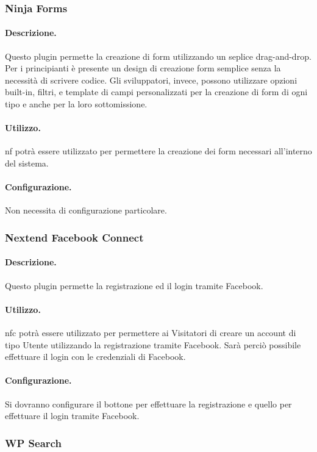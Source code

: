 \subsubsection{Ninja Forms}
\paragraph{Descrizione.} Questo plugin permette la creazione di form utilizzando un seplice drag-and-drop. Per i principianti è presente un design di creazione form semplice senza la necessità di scrivere codice. Gli sviluppatori, invece, possono utilizzare opzioni built-in, filtri, e template di campi personalizzati per la creazione di form di ogni tipo e anche per la loro sottomissione.
\paragraph{Utilizzo.} \gls{nf} potrà essere utilizzato per permettere la creazione dei form necessari all'interno del sistema.
\paragraph{Configurazione.} Non necessita di configurazione particolare.

\subsubsection{Nextend Facebook Connect}
\paragraph{Descrizione.} Questo plugin permette la registrazione ed il login tramite Facebook.
\paragraph{Utilizzo.} \gls{nfc} potrà essere utilizzato per permettere ai Visitatori di creare un account di tipo Utente utilizzando la registrazione tramite Facebook. Sarà perciò possibile effettuare il login con le credenziali di Facebook.
\paragraph{Configurazione.} Si dovranno configurare il bottone per effettuare la registrazione e quello per effettuare il login tramite Facebook.

\subsubsection{WP Search}
